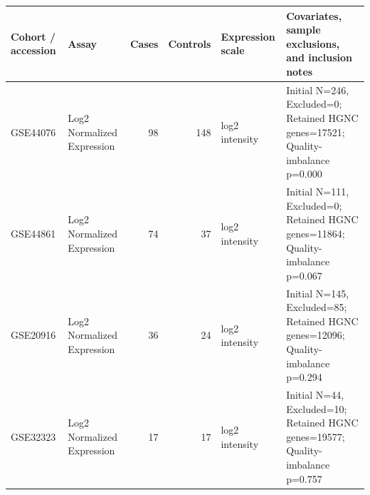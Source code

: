 \begin{tabular}{llrrll}
\toprule
Cohort / accession & Assay & Cases & Controls & Expression scale & Covariates, sample exclusions, and inclusion notes \\
\midrule
GSE44076 & Log2 Normalized Expression & 98 & 148 & log2 intensity & Initial N=246, Excluded=0; Retained HGNC genes=17521; Quality-imbalance p=0.000 \\
GSE44861 & Log2 Normalized Expression & 74 & 37 & log2 intensity & Initial N=111, Excluded=0; Retained HGNC genes=11864; Quality-imbalance p=0.067 \\
GSE20916 & Log2 Normalized Expression & 36 & 24 & log2 intensity & Initial N=145, Excluded=85; Retained HGNC genes=12096; Quality-imbalance p=0.294 \\
GSE32323 & Log2 Normalized Expression & 17 & 17 & log2 intensity & Initial N=44, Excluded=10; Retained HGNC genes=19577; Quality-imbalance p=0.757 \\
\bottomrule
\end{tabular}
